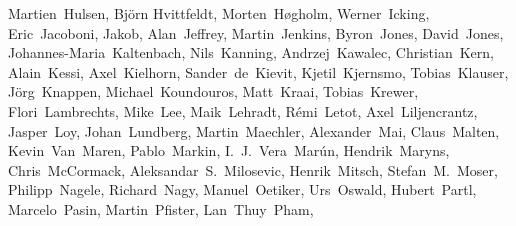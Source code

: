 {Martien~Hulsen,         %
Bj\"orn Hvittfeldt,     %
Morten~H\o gholm,       %
Werner~Icking,          %
Eric~Jacoboni,          %
Jakob,                  %
Alan~Jeffrey,           %
Martin~Jenkins,         %
Byron~Jones,            %
David~Jones,            %
Johannes-Maria~Kaltenbach, %
Nils~Kanning,           %
Andrzej~Kawalec,        %
Christian~Kern,         %
Alain~Kessi,            %
Axel~Kielhorn,          %
Sander~de~Kievit,       %
Kjetil~Kjernsmo,        %
Tobias~Klauser,		%
J\"org~Knappen,         %
Michael~Koundouros,     %
Matt~Kraai,             %
Tobias~Krewer,          %
Flori~Lambrechts,       %
Mike~Lee,               %
Maik~Lehradt,           %
R\'emi~Letot,           %
Axel~Liljencrantz,	%
Jasper~Loy,             %
Johan~Lundberg,         %
Martin~Maechler,        %
Alexander~Mai,          %
Claus~Malten,           %
Kevin~Van~Maren,        %
Pablo~Markin,
I.~J.~Vera~Mar\'un,     %
Hendrik~Maryns,         %
Chris~McCormack,        %
Aleksandar~S.~Milosevic, %
Henrik~Mitsch,          %
Stefan~M.~Moser,        %
Philipp~Nagele,         %
Richard~Nagy,           %
Manuel~Oetiker,         %
Urs~Oswald,             %
Hubert~Partl,           %
Marcelo~Pasin,          %
Martin~Pfister,		%
Lan~Thuy~Pham,          %
}
